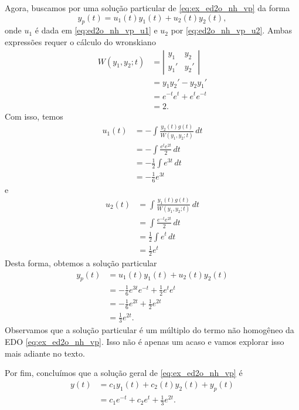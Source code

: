 \begin{ex}
  Agora, buscamos por uma solução particular de \eqref{eq:ex_ed2o_nh_vp} da forma
  \begin{equation}
    y_p(t) = u_1(t)y_1(t) + u_2(t)y_2(t),
  \end{equation}
  onde $u_1$ é dada em \eqref{eq:ed2o_nh_vp_u1} e $u_2$ por \eqref{eq:ed2o_nh_vp_u2}. Ambas expressões requer o cálculo do wronskiano
  \begin{align}
    W(y_1,y_2;t) &= \left|
                   \begin{matrix}
                     y_1 & y_2 \\
                     y_1' & y_2'
                   \end{matrix}
                            \right| \\
                 &= y_1y_2' - y_2y_1' \\
                 &= e^{-t}e^t + e^te^{-t} \\
                 &= 2.
  \end{align}
  Com isso, temos
  \begin{align}
    u_1(t) &= -\int \frac{y_2(t)g(t)}{W(y_1,y_2;t)}\,dt \\
           &= -\int \frac{e^te^{2t}}{2}\,dt \\
           &= -\frac{1}{2}\int e^{3t}\,dt \\
           &= -\frac{1}{6}e^{3t}
  \end{align}
  e
  \begin{align}
    u_2(t) &= \int \frac{y_1(t)g(t)}{W(y_1,y_2;t)}\,dt \\
           &= \int \frac{e^{-t}e^{2t}}{2}\,dt \\
           &= \frac{1}{2}\int e^{t}\,dt \\
           &= \frac{1}{2}e^{t}
  \end{align}
  Desta forma, obtemos a solução particular
  \begin{align}
    y_p(t) &= u_1(t)y_1(t) + u_2(t)y_2(t) \\
           &= -\frac{1}{6}e^{3t}e^{-t} + \frac{1}{2}e^{t}e^{t} \\
           &= -\frac{1}{6}e^{2t} + \frac{1}{2}e^{2t} \\
           &= \frac{1}{3}e^{2t}.
  \end{align}
  Observamos que a solução particular é um múltiplo do termo não homogêneo da EDO \eqref{eq:ex_ed2o_nh_vp}. Isso não é apenas um acaso e vamos explorar isso mais adiante no texto.

  Por fim, concluímos que a solução geral de \eqref{eq:ex_ed2o_nh_vp} é
  \begin{align}
    y(t) &= c_1y_1(t) + c_2(t)y_2(t) + y_p(t) \\
         &= c_1e^{-t} + c_2e^t + \frac{1}{3}e^{2t}.
  \end{align}
\end{ex}

